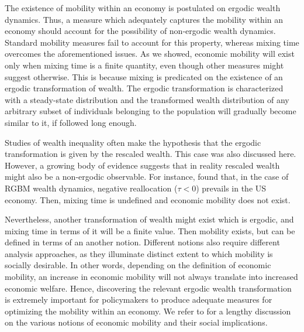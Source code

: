 \documentclass[11pt]{article}
\numberwithin{equation}{section}
\begin{document}
The existence of mobility within an economy is postulated on ergodic wealth dynamics. Thus, a measure which adequately captures the mobility within an economy should account for the possibility of non-ergodic wealth dynamics. Standard mobility measures fail to account for this property, whereas mixing time overcomes the aforementioned issues. As we showed, economic mobility will exist only when mixing time is a finite quantity, even though other measures might suggest otherwise. This is because mixing is predicated on the existence of an ergodic transformation of wealth. The ergodic transformation is characterized with a steady-state distribution and the transformed wealth distribution of any arbitrary subset of individuals belonging to the population will gradually become similar to it, if followed long enough.

Studies of wealth inequality often make the hypothesis that the ergodic transformation is given by the rescaled wealth. This case was also discussed here. However, a growing body of evidence suggests that in reality rescaled wealth might also be a non-ergodic observable. For instance, \citet{BermanPetersAdamou2019} found that, in the case of RGBM wealth dynamics, negative reallocation ($\tau < 0$) prevails in the US economy. Then, mixing time is undefined and economic mobility does not exist.
 
Nevertheless, another transformation of wealth might exist which is ergodic, and mixing time in terms of it will be a finite value. Then mobility exists, but can be defined in terms of an another notion. Different notions also require different analysis approaches, as they illuminate distinct extent to which mobility is socially desirable. In other words, depending on the definition of economic mobility, an increase in economic mobility will not always translate into increased economic welfare. Hence, discovering the relevant ergodic wealth transformation is extremely important for policymakers to produce adequate measures for optimizing the mobility within an economy. We refer to \citet{JanttiJenkins2015} for a lengthy discussion on the various notions of economic mobility and their social implications.
\end{document}
